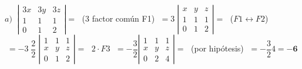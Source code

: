 \begin{proofw}\renewcommand{\qedsymbol}{$\diamond$}

$a)\; \;  \left| \begin{matrix} 3x&3y&3z\\1&1&1\\0&1&2   \end{matrix} \right|=\; $ \textcolor{gris}{(3 factor común F1)} $\; = 3\; \left| \begin{matrix} x&y&z\\1&1&1\\0&1&2   \end{matrix} \right|=\; $ \textcolor{gris}{($F1\leftrightarrow F2$)} $\;= -3\; \dfrac 2 2 \; \left| \begin{matrix} 1&1&1\\x&y&z\\0&1&2   \end{matrix} \right|=\; $ \textcolor{gris}{$2\cdot F3$} $\; = - \dfrac 3 2 \left| \begin{matrix} 1&1&1\\x&y&z\\0&2&4   \end{matrix} \right| =\;$ \textcolor{gris}{(por hipótesis)} $\; = - \dfrac 3 2 4 = \boldsymbol{-6}$


\end{proofw}
